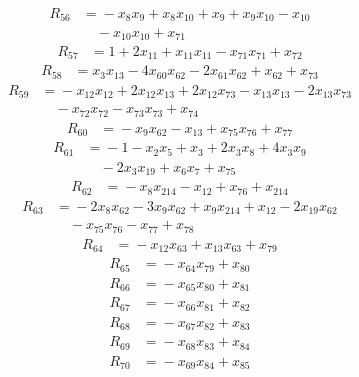 \begin{align*}
R_{56}&={}-x_{8}x_{9} +x_{8}x_{10} +x_{9} +x_{9}x_{10} -x_{10}\\
&\quad{}-x_{10}x_{10} +x_{71}
\end{align*}
\begin{align*}
R_{57}&={}1 +2x_{11} +x_{11}x_{11} -x_{71}x_{71} +x_{72}
\end{align*}
\begin{align*}
R_{58}&={}x_{3}x_{13} -4x_{60}x_{62} -2x_{61}x_{62} +x_{62} +x_{73}
\end{align*}
\begin{align*}
R_{59}&={}-x_{12}x_{12} +2x_{12}x_{13} +2x_{12}x_{73} -x_{13}x_{13} -2x_{13}x_{73}\\
&\quad{}-x_{72}x_{72} -x_{73}x_{73} +x_{74}
\end{align*}
\begin{align*}
R_{60}&={}-x_{9}x_{62} -x_{13} +x_{75}x_{76} +x_{77}
\end{align*}
\begin{align*}
R_{61}&={}-1 -x_{2}x_{5} +x_{3} +2x_{3}x_{8} +4x_{3}x_{9}\\
&\quad{}-2x_{3}x_{19} +x_{6}x_{7} +x_{75}
\end{align*}
\begin{align*}
R_{62}&={}-x_{8}x_{214} -x_{12} +x_{76} +x_{214}
\end{align*}
\begin{align*}
R_{63}&={}-2x_{8}x_{62} -3x_{9}x_{62} +x_{9}x_{214} +x_{12} -2x_{19}x_{62}\\
&\quad{}-x_{75}x_{76} -x_{77} +x_{78}
\end{align*}
\begin{align*}
R_{64}&={}-x_{12}x_{63} +x_{13}x_{63} +x_{79}
\end{align*}
\begin{align*}
R_{65}&={}-x_{64}x_{79} +x_{80}
\end{align*}
\begin{align*}
R_{66}&={}-x_{65}x_{80} +x_{81}
\end{align*}
\begin{align*}
R_{67}&={}-x_{66}x_{81} +x_{82}
\end{align*}
\begin{align*}
R_{68}&={}-x_{67}x_{82} +x_{83}
\end{align*}
\begin{align*}
R_{69}&={}-x_{68}x_{83} +x_{84}
\end{align*}
\begin{align*}
R_{70}&={}-x_{69}x_{84} +x_{85}
\end{align*}
